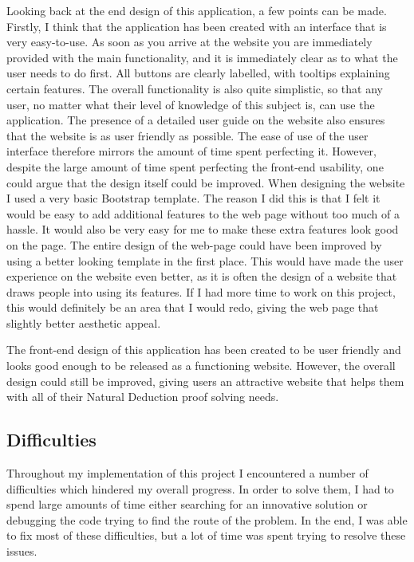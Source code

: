 Looking back at the end design of this application, a few points can be made. Firstly, I think that the application has been created with an interface that is very easy-to-use. As soon as you arrive at the website you are immediately provided with the main functionality, and it is immediately clear as to what the user needs to do first. All buttons are clearly labelled, with tooltips explaining certain features. The overall functionality is also quite simplistic, so that any user, no matter what their level of knowledge of this subject is, can use the application. The presence of a detailed user guide on the website also ensures that the website is as user friendly as possible. The ease of use of the user interface therefore mirrors the amount of time spent perfecting it. However, despite the large amount of time spent perfecting the front-end usability, one could argue that the design itself could be improved. When designing the website I used a very basic Bootstrap template. The reason I did this is that I felt it would be easy to add additional features to the web page without too much of a hassle. It would also be very easy for me to make these extra features look good on the page. The entire design of the web-page could have been improved by using a better looking template in the first place. This would have made the user experience on the website even better, as it is often the design of a website that draws people into using its features. If I had more time to work on this project, this would definitely be an area that I would redo, giving the web page that slightly better aesthetic appeal.

The front-end design of this application has been created to be user friendly and looks good enough to be released as a functioning website. However, the overall design could still be improved, giving users an attractive website that helps them with all of their Natural Deduction proof solving needs.

\subsection{Difficulties \label{difficulties}}

Throughout my implementation of this project I encountered a number of difficulties which hindered my overall progress. In order to solve them, I had to spend large amounts of time either searching for an innovative solution or debugging the code trying to find the route of the problem. In the end, I was able to fix most of these difficulties, but a lot of time was spent trying to resolve these issues.

